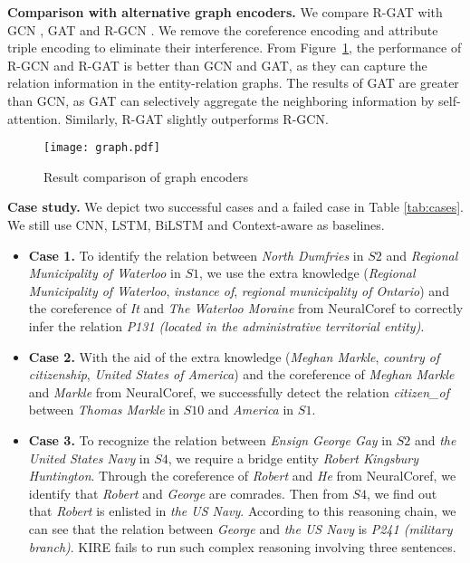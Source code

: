 \documentclass[runningheads]{llncs}
\begin{document}
\textbf{Comparison with alternative graph encoders.}
We compare R-GAT with GCN \cite{kipf2017semi}, GAT \cite{velivckovic2017graph} and R-GCN \cite{schlichtkrull2018modeling}. 
We remove the coreference encoding and attribute triple encoding to eliminate their interference.
From Figure~\ref{fig:graph}, the performance of R-GCN and R-GAT is better than GCN and GAT, as they can capture the relation information in the entity-relation graphs. 
The results of GAT are greater than GCN, as GAT can selectively aggregate the neighboring information by self-attention. 
Similarly, R-GAT slightly outperforms R-GCN.

\begin{figure}[!tb]
	\centering
	\texttt{[image: graph.pdf]}
	\caption{Result comparison of graph encoders}
	\label{fig:graph}
\end{figure}


\textbf{Case study.}  
We depict two successful cases and a failed case in Table \ref{tab:cases}. We still use CNN, LSTM, BiLSTM and Context-aware as baselines.
\begin{itemize}
\item \textbf{Case 1.} To identify the relation between \textit{North Dumfries} in $S2$ and \textit{Regional Municipality of Waterloo} in $S1$, we use the extra knowledge (\textit{Regional Municipality of Waterloo}, \textit{instance of}, \textit{regional municipality of Ontario}) and the coreference of \textit{It} and \textit{The Waterloo Moraine} from NeuralCoref to correctly infer the relation \textit{P131 (located in the administrative territorial entity)}.

\item \textbf{Case 2.} With the aid of the extra knowledge (\textit{Meghan Markle}, \textit{country of citizenship}, \textit{United States of America}) and the coreference of \textit{Meghan Markle} and \textit{Markle} from NeuralCoref, we successfully detect the relation \textit{citizen\_of} between \textit{Thomas Markle} in $S10$ and \textit{America} in $S1$.

\item \textbf{Case 3.} To recognize the relation between \textit{Ensign George Gay} in $S2$ and \textit{the United States Navy} in $S4$, we require a bridge entity \textit{Robert Kingsbury Huntington}. 
Through the coreference of \textit{Robert} and \textit{He} from NeuralCoref, we identify that \emph{Robert} and \textit{George} are comrades. 
Then from $S4$, we find out that \textit{Robert} is enlisted in \textit{the US Navy}. 
According to this reasoning chain, we can see that the relation between \textit{George} and \textit{the US Navy} is \textit{P241 (military branch)}. 
KIRE fails to run such complex reasoning involving three sentences.
\end{itemize}
\end{document}
